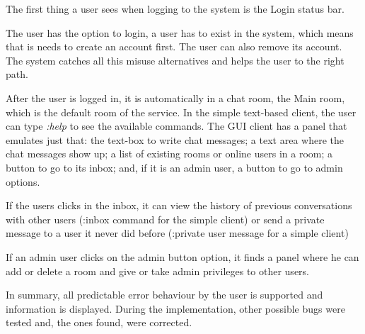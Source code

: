 The first thing a user sees when logging to the system is the Login status bar.
    
The user has the option to login, a user has to exist in the system, which means that is needs to create an account first. The user can also remove its account. The system catches all this misuse alternatives and helps the user to the right path.

After the user is logged in, it is automatically in a chat room, the Main room, which is the default room of the service. In the simple text-based client, the user can type \emph{:help} to see the available commands. The GUI client has a panel that emulates just that: the text-box to write chat messages; a text area where the chat messages show up; a list of existing rooms or online users in a room; a button to go to its inbox; and, if it is an admin user, a button to go to admin options.

If the users clicks in the inbox, it can view the history of previous conversations with other users (:inbox command for the simple client) or send a private message to a user it never did before (:private user message for a simple client)

If an admin user clicks on the admin button option, it finds a panel where he can add or delete a room and give or take admin privileges to other users. 

In summary, all predictable error behaviour by the user is supported and information is displayed. During the implementation, other possible bugs were tested and, the ones found, were corrected.
